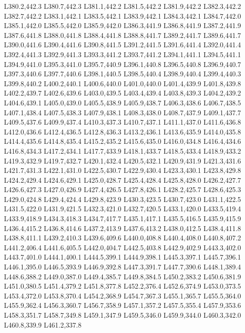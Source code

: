 		L380.2,442.3 L380.7,442.3 L381.1,442.2 L381.5,442.2 L381.9,442.2 L382.3,442.2 L382.7,442.2 L383.1,442.1
		L383.5,442.1 L383.9,442.1 L384.3,442.1 L384.7,442.0 L385.1,442.0 L385.5,442.0 L385.9,442.0 L386.3,441.9
		L386.8,441.9 L387.2,441.9 L387.6,441.8 L388.0,441.8 L388.4,441.8 L388.8,441.7 L389.2,441.7 L389.6,441.7
		L390.0,441.6 L390.4,441.6 L390.8,441.5 L391.2,441.5 L391.6,441.4 L392.0,441.4 L392.4,441.3 L392.9,441.3
		L393.3,441.2 L393.7,441.2 L394.1,441.1 L394.5,441.1 L394.9,441.0 L395.3,441.0 L395.7,440.9 L396.1,440.8
		L396.5,440.8 L396.9,440.7 L397.3,440.6 L397.7,440.6 L398.1,440.5 L398.5,440.4 L398.9,440.4 L399.4,440.3
		L399.8,440.2 L400.2,440.1 L400.6,440.0 L401.0,440.0 L401.4,439.9 L401.8,439.8 L402.2,439.7 L402.6,439.6
		L403.0,439.5 L403.4,439.4 L403.8,439.3 L404.2,439.2 L404.6,439.1 L405.0,439.0 L405.5,438.9 L405.9,438.7
		L406.3,438.6 L406.7,438.5 L407.1,438.4 L407.5,438.3 L407.9,438.1 L408.3,438.0 L408.7,437.9 L409.1,437.7
		L409.5,437.6 L409.9,437.4 L410.3,437.3 L410.7,437.1 L411.1,437.0 L411.6,436.8 L412.0,436.6 L412.4,436.5
		L412.8,436.3 L413.2,436.1 L413.6,435.9 L414.0,435.8 L414.4,435.6 L414.8,435.4 L415.2,435.2 L415.6,435.0
		L416.0,434.8 L416.4,434.6 L416.8,434.3 L417.2,434.1 L417.7,433.9 L418.1,433.7 L418.5,433.4 L418.9,433.2
		L419.3,432.9 L419.7,432.7 L420.1,432.4 L420.5,432.1 L420.9,431.9 L421.3,431.6 L421.7,431.3 L422.1,431.0
		L422.5,430.7 L422.9,430.4 L423.3,430.1 L423.8,429.8 L424.2,429.4 L424.6,429.1 L425.0,428.7 L425.4,428.4
		L425.8,428.0 L426.2,427.7 L426.6,427.3 L427.0,426.9 L427.4,426.5 L427.8,426.1 L428.2,425.7 L428.6,425.3
		L429.0,424.8 L429.4,424.4 L429.8,423.9 L430.3,423.5 L430.7,423.0 L431.1,422.5 L431.5,422.0 L431.9,421.5
		L432.3,421.0 L432.7,420.5 L433.1,420.0 L433.5,419.4 L433.9,418.9 L434.3,418.3 L434.7,417.7 L435.1,417.1
		L435.5,416.5 L435.9,415.9 L436.4,415.2 L436.8,414.6 L437.2,413.9 L437.6,413.2 L438.0,412.5 L438.4,411.8
		L438.8,411.1 L439.2,410.3 L439.6,409.6 L440.0,408.8 L440.4,408.0 L440.8,407.2 L441.2,406.4 L441.6,405.5
		L442.0,404.7 L442.5,403.8 L442.9,402.9 L443.3,402.0 L443.7,401.0 L444.1,400.1 L444.5,399.1 L444.9,398.1
		L445.3,397.1 L445.7,396.1 L446.1,395.0 L446.5,393.9 L446.9,392.8 L447.3,391.7 L447.7,390.6 L448.1,389.4
		L448.6,388.2 L449.0,387.0 L449.4,385.7 L449.8,384.5 L450.2,383.2 L450.6,381.9 L451.0,380.5 L451.4,379.2
		L451.8,377.8 L452.2,376.4 L452.6,374.9 L453.0,373.5 L453.4,372.0 L453.8,370.4 L454.2,368.9 L454.7,367.3
		L455.1,365.7 L455.5,364.0 L455.9,362.4 L456.3,360.7 L456.7,358.9 L457.1,357.2 L457.5,355.4 L457.9,353.6
		L458.3,351.7 L458.7,349.8 L459.1,347.9 L459.5,346.0 L459.9,344.0 L460.3,342.0 L460.8,339.9 L461.2,337.8
